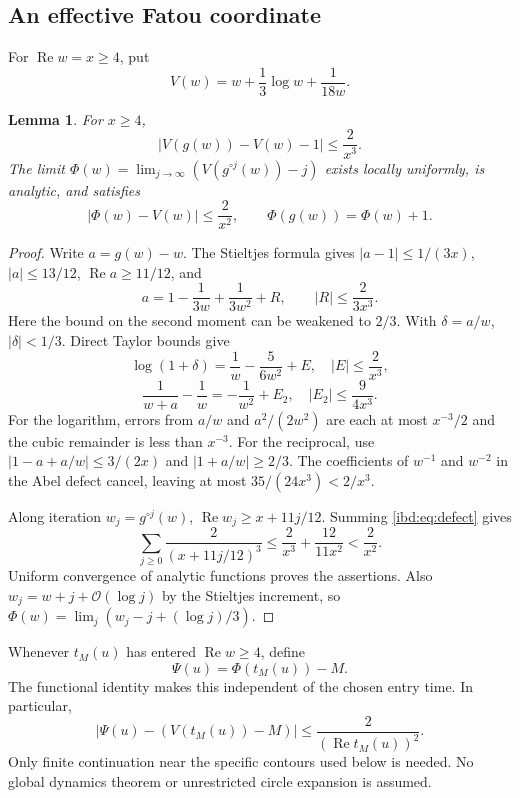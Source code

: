 \documentclass[11pt,letterpaper]{article}
\newtheorem{lemma}[theorem]{Lemma}
\theoremstyle{remark}\newtheorem{remark}[theorem]{Remark}
\newcommand{\Oh}{\mathcal O}
\DeclareMathOperator{\Rea}{Re}
\begin{document}
\subsection{An effective Fatou coordinate}
For $\Rea w=x\geq4$, put
\[
 V(w)=w+\frac13\log w+\frac1{18w}.
\]
\begin{lemma}\label{ibd:lem:tail}
For $x\geq4$,
\begin{equation}\label{ibd:eq:defect}
 |V(g(w))-V(w)-1|\leq\frac2{x^3}.
\end{equation}
The limit $\Phi(w)=\lim_{j\to\infty}(V(g^{\circ j}(w))-j)$ exists locally uniformly, is analytic, and satisfies
\begin{equation}\label{ibd:eq:tail}
 |\Phi(w)-V(w)|\leq\frac2{x^2},\qquad
 \Phi(g(w))=\Phi(w)+1.
\end{equation}
\end{lemma}
\begin{proof}
Write $a=g(w)-w$. The Stieltjes formula gives
$|a-1|\leq1/(3x)$, $|a|\leq13/12$, $\Rea a\geq11/12$, and
\[
 a=1-\frac1{3w}+\frac1{3w^2}+R,\qquad |R|\leq\frac2{3x^3}.
\]
Here the bound on the second moment can be weakened to $2/3$. With $\delta=a/w$, $|\delta|<1/3$. Direct Taylor bounds give
\[
 \log(1+\delta)=\frac1w-\frac5{6w^2}+E,\quad |E|\leq\frac2{x^3},
\]
\[
 \frac1{w+a}-\frac1w=-\frac1{w^2}+E_2,\quad |E_2|\leq\frac9{4x^3}.
\]
For the logarithm, errors from $a/w$ and $a^2/(2w^2)$ are each at most $x^{-3}/2$ and the cubic remainder is less than $x^{-3}$. For the reciprocal, use
$|1-a+a/w|\leq3/(2x)$ and $|1+a/w|\geq2/3$.
The coefficients of $w^{-1}$ and $w^{-2}$ in the Abel defect cancel, leaving at most $35/(24x^3)<2/x^3$.

Along iteration $w_j=g^{\circ j}(w)$, $\Rea w_j\geq x+11j/12$. Summing \eqref{ibd:eq:defect} gives
\[
 \sum_{j\geq0}\frac2{(x+11j/12)^3}
 \leq\frac2{x^3}+\frac{12}{11x^2}<\frac2{x^2}.
\]
Uniform convergence of analytic functions proves the assertions. Also $w_j=w+j+\Oh(\log j)$ by the Stieltjes increment, so
$\Phi(w)=\lim_j(w_j-j+(\log j)/3)$.
\end{proof}
Whenever $t_M(u)$ has entered $\Rea w\geq4$, define
\begin{equation}\label{ibd:eq:psi}
 \Psi(u)=\Phi(t_M(u))-M.
\end{equation}
The functional identity makes this independent of the chosen entry time. In particular,
\begin{equation}\label{ibd:eq:psitail}
 \left|\Psi(u)-\left(V(t_M(u))-M\right)\right|
 \leq\frac2{(\Rea t_M(u))^2}.
\end{equation}
Only finite continuation near the specific contours used below is needed. No global dynamics theorem or unrestricted circle expansion is assumed.
\end{document}
